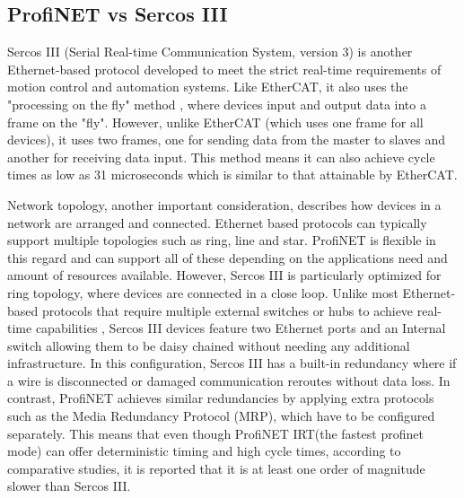 \documentclass[conference]{IEEEtran}
\begin{document}
\subsection{ProfiNET vs Sercos III}
Sercos III (Serial Real-time Communication System, version 3) is another Ethernet-based protocol developed to meet the strict real-time requirements of motion control and automation systems. Like EtherCAT, it also uses the  "processing on the fly" method , where devices input and output data into a frame on the "fly". However, unlike EtherCAT (which uses one frame for all devices), it uses two frames, one for sending data from the master to slaves and another for receiving data input. This method means it can also achieve cycle times as low as 31 microseconds\cite{hibbard2010sercos} which is similar to that attainable by EtherCAT.

Network topology, another important consideration, describes how devices in a network are arranged and connected. Ethernet based protocols can typically support multiple topologies such as ring, line and star. ProfiNET is flexible in this regard and can support all of these depending on the applications need and amount of resources available\cite{pi2019topology}. However, Sercos III is particularly optimized for ring topology, where devices are connected in a close loop. Unlike most Ethernet-based protocols that require multiple external switches or hubs to achieve real-time capabilities , Sercos III devices feature two Ethernet ports and an Internal switch allowing them to be daisy chained without needing any additional infrastructure\cite{hibbard2010sercos}. In this configuration, Sercos III has a built-in redundancy where if a wire is disconnected or damaged communication reroutes without data loss\cite{sercosRedundancy}. In contrast, ProfiNET achieves similar redundancies by applying extra protocols such as the Media Redundancy Protocol (MRP), which have to be configured separately\cite{pi2019topology}. This means that even though ProfiNET IRT(the fastest profinet mode) can offer deterministic timing and high cycle times, according to comparative studies, it is reported that it is at least one order of magnitude slower than Sercos III\cite{kingstarEtherCAT2020}.
\end{document}
